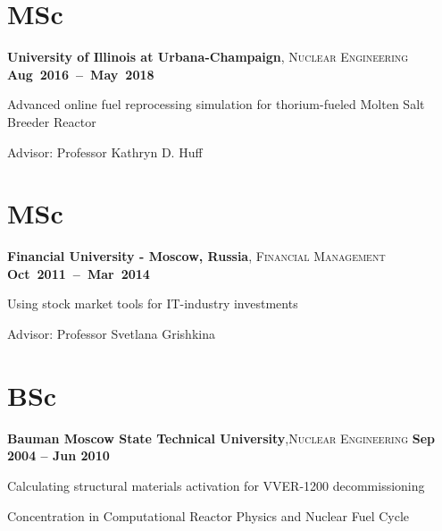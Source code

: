 \documentclass[margin,line]{resume}
\begin{document}
\begin{resume}
    \section{\mysidestyle MSc}
    \textbf{University of Illinois at Urbana-Champaign}, \textsc{Nuclear Engineering} \hfill\textbf{\mbox{Aug 2016 -- May 2018}}\vspace{-3mm}\\\vspace{-1mm}%
    \begin{list2}
        \item Advanced online fuel reprocessing simulation for thorium-fueled Molten Salt Breeder Reactor
        \item Advisor:  Professor Kathryn D. Huff
    \end{list2}\vspace{-1.5mm}
    \section{\mysidestyle MSc}
    \textbf{Financial University - Moscow, Russia}, \textsc{Financial Management} \hfill \textbf{\mbox{Oct 2011 -- Mar 2014	}}\vspace{-3mm}\\\vspace{-1mm}%
    \begin{list2}
        \item Using stock market tools for IT-industry investments
        \item Advisor:  Professor Svetlana Grishkina
    \end{list2}\vspace{-1.5mm}
    \section{\mysidestyle BSc}
    \textbf{Bauman Moscow State Technical University},\textsc{Nuclear Engineering}\hfill \textbf{ Sep 2004 -- Jun 2010}\vspace{-3mm}\\\vspace{-1mm}%
    \begin{list2}
	\item Calculating structural materials activation for VVER-1200 decommissioning
	\item Concentration in Computational Reactor Physics and Nuclear Fuel Cycle
    \end{list2}\vspace{-1.5mm}


\end{resume}
\end{document}
